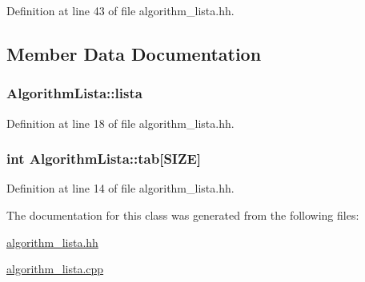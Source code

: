 Definition at line 43 of file algorithm\-\_\-lista.\-hh.



\subsection{Member Data Documentation}
\hypertarget{class_algorithm_lista_a5c4c8b55e6d71eae06c98cd39f38bb30}{
\subsubsection[{lista}]{ Algorithm\-Lista\-::lista\hspace{0.3cm}{\ttfamily [private]}}}\label{class_algorithm_lista_a5c4c8b55e6d71eae06c98cd39f38bb30}


Definition at line 18 of file algorithm\-\_\-lista.\-hh.

\hypertarget{class_algorithm_lista_ad04d74953d75c8886b0c5cfda71773f7}{
\subsubsection[{tab}]{\setlength{\rightskip}{0pt plus 5cm}int Algorithm\-Lista\-::tab\mbox{[}{\bf S\-I\-Z\-E}\mbox{]}\hspace{0.3cm}{\ttfamily [private]}}}\label{class_algorithm_lista_ad04d74953d75c8886b0c5cfda71773f7}


Definition at line 14 of file algorithm\-\_\-lista.\-hh.



The documentation for this class was generated from the following files\-:\begin{DoxyCompactItemize}
\item 
\hyperlink{algorithm__lista_8hh}{algorithm\-\_\-lista.\-hh}\item 
\hyperlink{algorithm__lista_8cpp}{algorithm\-\_\-lista.\-cpp}\end{DoxyCompactItemize}
